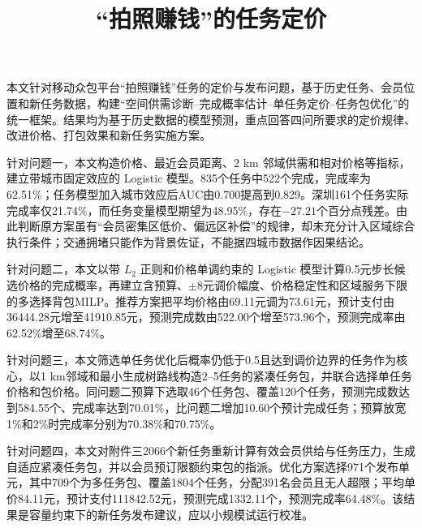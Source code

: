 ﻿\documentclass[UTF8,zihao=-4,a4paper,fontset=fandol]{ctexart}
\title{“拍照赚钱”的任务定价}
\author{}
\date{}
\begin{document}
\maketitle

\begin{cumcmabstract}
\hspace{2em}本文针对移动众包平台“拍照赚钱”任务的定价与发布问题，基于历史任务、会员位置和新任务数据，构建“空间供需诊断--完成概率估计--单任务定价--任务包优化”的统一框架。结果均为基于历史数据的模型预测，重点回答四问所要求的定价规律、改进价格、打包效果和新任务实施方案。

\hspace{2em}针对问题一，本文构造价格、最近会员距离、2 km 邻域供需和相对价格等指标，建立带城市固定效应的 Logistic 模型。835个任务中522个完成，完成率为62.51\%；任务模型加入城市效应后AUC由0.700提高到0.829。深圳161个任务实际完成率仅21.74\%，而任务变量模型期望为48.95\%，存在$-27.21$个百分点残差。由此判断原方案虽有“会员密集区低价、偏远区补偿”的规律，却未充分计入区域综合执行条件；交通拥堵只能作为背景佐证，不能据四城市数据作因果结论。

\hspace{2em}针对问题二，本文以带 $L_2$ 正则和价格单调约束的 Logistic 模型计算0.5元步长候选价格的完成概率，再建立含预算、$\pm8$元调价幅度、价格稳定性和区域服务下限的多选择背包MILP。推荐方案把平均价格由69.11元调为73.61元，预计支付由36444.28元增至41910.85元，预测完成数由522.00个增至573.96个，预测完成率由62.52\%增至68.74\%。

\hspace{2em}针对问题三，本文筛选单任务优化后概率仍低于0.5且达到调价边界的任务作为核心，以1 km邻域和最小生成树路线构造2--5任务的紧凑任务包，并联合选择单任务价格和包价格。同问题二预算下选取46个任务包、覆盖120个任务，预测完成数达到584.55个、完成率达到70.01\%，比问题二增加10.60个预计完成任务；预算放宽1\%和2\%时完成率分别为70.38\%和70.75\%。

\hspace{2em}针对问题四，本文对附件三2066个新任务重新计算有效会员供给与任务压力，生成自适应紧凑任务包，并以会员预订限额约束包的指派。优化方案选择971个发布单元，其中709个为多任务包、覆盖1804个任务，分配391名会员且无人超限；平均单价84.11元，预计支付111842.52元，预测完成1332.11个，预测完成率64.48\%。该结果是容量约束下的新任务发布建议，应以小规模试运行校准。
\end{cumcmabstract}

\end{document}

